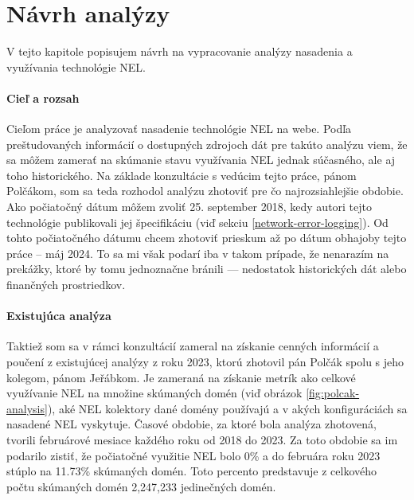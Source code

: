 \chapter{Návrh analýzy}
\label{possible-analysis-strategies}


V tejto kapitole popisujem návrh na vypracovanie analýzy nasadenia a využívania technológie NEL.

\subsubsection{Cieľ a rozsah}

Cieľom práce je analyzovať nasadenie technológie NEL na webe. 
Podľa preštudovaných informácií o dostupných zdrojoch dát pre takúto analýzu viem, že sa môžem zamerať
na skúmanie stavu využívania NEL jednak súčasného, ale aj toho historického.
Na základe konzultácie s vedúcim tejto práce, pánom Polčákom, som sa teda rozhodol analýzu zhotoviť pre čo 
najrozsiahlejšie obdobie.
Ako počiatočný dátum môžem zvoliť 25. september 2018, kedy autori tejto technológie publikovali jej špecifikáciu (viď sekciu \ref{network-error-logging}).
Od tohto počiatočného dátumu chcem zhotoviť prieskum až po dátum obhajoby tejto práce -- máj 2024.
To sa mi však podarí iba v takom prípade, že nenarazím na prekážky, ktoré by tomu jednoznačne bránili --- nedostatok historických dát alebo finančných prostriedkov.

\subsubsection{Existujúca analýza}

Taktiež som sa v rámci konzultácií zameral na získanie cenných informácií a poučení z existujúcej analýzy z roku 2023,
ktorú zhotovil pán Polčák spolu s jeho kolegom, pánom Jeřábkom.
Je zameraná na získanie metrík ako celkové využívanie NEL na množine skúmaných domén (viď obrázok \ref{fig:polcak-analysis}), aké NEL kolektory dané domény používajú a v akých konfiguráciách sa nasadené NEL vyskytuje.
Časové obdobie, za ktoré bola analýza zhotovená, tvorili februárové mesiace každého roku od 2018 do 2023. 
Za toto obdobie sa im podarilo zistiť, že počiatočné využitie NEL bolo 0\% a do februára roku 2023 stúplo na 11.73\% skúmaných domén.
Toto percento predstavuje z celkového počtu skúmaných domén 2,247,233 jedinečných domén.

